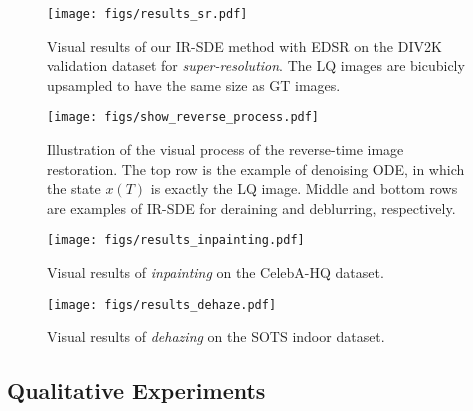 \documentclass{article}
\theoremstyle{plain}
\theoremstyle{definition}
\theoremstyle{remark}
\begin{document}
\begin{figure}[t]
\begin{center}
\centerline{\texttt{[image: figs/results\_sr.pdf]}}\vspace{-2.0mm}
\caption{Visual results of our IR-SDE method with EDSR on the DIV2K validation dataset for \emph{super-resolution}. The LQ images are bicubicly upsampled to have the same size as GT images.}
\label{fig:sr_results}
\end{center}
\vskip -0.2in
\end{figure}

\begin{figure*}[ht]
\begin{center}
\centerline{\texttt{[image: figs/show\_reverse\_process.pdf]}}\vspace{-2.0mm}
\caption{Illustration of the visual process of the reverse-time image restoration. The top row is the example of denoising ODE, in which the state ${x}(T)$ is exactly the LQ image. Middle and bottom rows are examples of IR-SDE for deraining and deblurring, respectively.}
\label{fig:show_reverse_time_restoration}
\end{center}
\vskip -0.2in
\end{figure*}


\begin{figure}[t]
\begin{center}
\centerline{\texttt{[image: figs/results\_inpainting.pdf]}}\vspace{-2.0mm}
\caption{Visual results of \emph{inpainting} on the CelebA-HQ dataset.}
\label{fig:inpainting_results}
\end{center}
\vskip -0.2in
\end{figure}


\begin{figure}[t]
\begin{center}
\centerline{\texttt{[image: figs/results\_dehaze.pdf]}}\vspace{-2.0mm}
\caption{Visual results of \emph{dehazing} on the SOTS indoor dataset.}
\label{fig:dehazing_results}
\end{center}
\vskip -0.2in
\end{figure}



\subsection{Qualitative Experiments}
\label{secton:experiments:qualitative}
\end{document}
